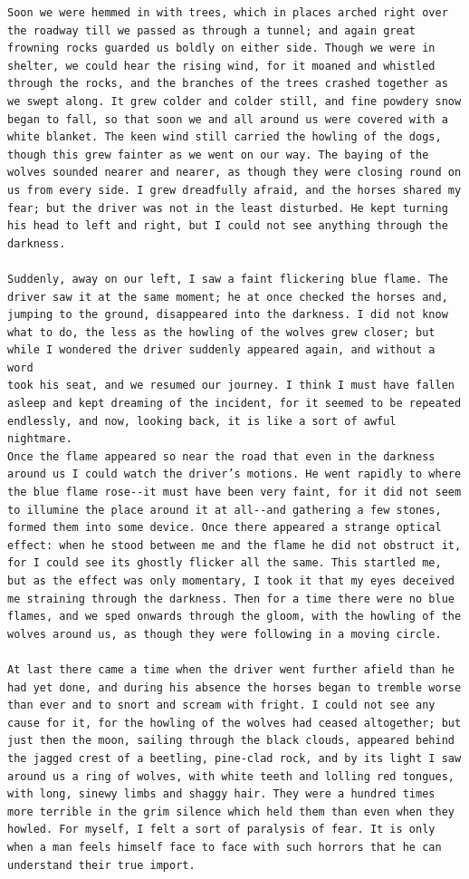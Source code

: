 \documentclass{article}
\begin{document}
\begin{verbatim}
Soon we were hemmed in with trees, which in places arched right over
the roadway till we passed as through a tunnel; and again great
frowning rocks guarded us boldly on either side. Though we were in
shelter, we could hear the rising wind, for it moaned and whistled
through the rocks, and the branches of the trees crashed together as
we swept along. It grew colder and colder still, and fine powdery snow
began to fall, so that soon we and all around us were covered with a
white blanket. The keen wind still carried the howling of the dogs,
though this grew fainter as we went on our way. The baying of the
wolves sounded nearer and nearer, as though they were closing round on
us from every side. I grew dreadfully afraid, and the horses shared my
fear; but the driver was not in the least disturbed. He kept turning
his head to left and right, but I could not see anything through the
darkness.

Suddenly, away on our left, I saw a faint flickering blue flame. The
driver saw it at the same moment; he at once checked the horses and,
jumping to the ground, disappeared into the darkness. I did not know
what to do, the less as the howling of the wolves grew closer; but
while I wondered the driver suddenly appeared again, and without a word
took his seat, and we resumed our journey. I think I must have fallen
asleep and kept dreaming of the incident, for it seemed to be repeated
endlessly, and now, looking back, it is like a sort of awful nightmare.
Once the flame appeared so near the road that even in the darkness
around us I could watch the driver’s motions. He went rapidly to where
the blue flame rose--it must have been very faint, for it did not seem
to illumine the place around it at all--and gathering a few stones,
formed them into some device. Once there appeared a strange optical
effect: when he stood between me and the flame he did not obstruct it,
for I could see its ghostly flicker all the same. This startled me,
but as the effect was only momentary, I took it that my eyes deceived
me straining through the darkness. Then for a time there were no blue
flames, and we sped onwards through the gloom, with the howling of the
wolves around us, as though they were following in a moving circle.

At last there came a time when the driver went further afield than he
had yet done, and during his absence the horses began to tremble worse
than ever and to snort and scream with fright. I could not see any
cause for it, for the howling of the wolves had ceased altogether; but
just then the moon, sailing through the black clouds, appeared behind
the jagged crest of a beetling, pine-clad rock, and by its light I saw
around us a ring of wolves, with white teeth and lolling red tongues,
with long, sinewy limbs and shaggy hair. They were a hundred times
more terrible in the grim silence which held them than even when they
howled. For myself, I felt a sort of paralysis of fear. It is only
when a man feels himself face to face with such horrors that he can
understand their true import.


\end{verbatim}
\end{document}
